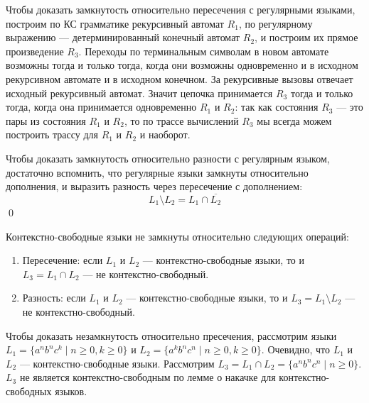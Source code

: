 Чтобы доказать замкнутость относительно пересечения с регулярными языками, построим по КС грамматике рекурсивный автомат $R_1$, по регулярному выражению --- детерминированный конечный автомат $R_2$, и построим их прямое произведение $R_3$.
Переходы по терминальным символам в новом автомате возможны тогда и только тогда, когда они возможны одновременно и в исходном рекурсивном автомате и в исходном конечном.
За рекурсивные вызовы отвечает исходный рекурсивный автомат.
Значит цепочка принимается $R_3$ тогда и только тогда, когда она принимается одновременно $R_1$ и $R_2$: так как состояния $R_3$ --- это пары из состояния $R_1$ и $R_2$, то по трассе вычислений $R_3$ мы всегда можем построить трассу для $R_1$ и $R_2$ и наоборот.

Чтобы доказать замкнутость относительно разности с регулярным языком, достаточно вспомнить, что регулярные языки замкнуты относительно дополнения, и выразить разность через пересечение с дополнением:
\[
  L_1 \setminus L_2 = L_1 \cap \overline{L_2}
\]
\qed

\begin{theorem}
Контекстно-свободные языки не замкнуты относительно следующих операций:
\begin{enumerate}
  \item Пересечение: если $L_1$ и $L_2$ --- контекстно-свободные языки, то и $L_3 = L_1 \cap L_2$ --- не контекстно-свободный.
  \item Разность: если $L_1$ и $L_2$ --- контекстно-свободные языки, то и $L_3 = L_1 \setminus L_2$ --- не контекстно-свободный.
\end{enumerate}
\end{theorem}

Чтобы доказать незамкнутость относительно пресечения, рассмотрим языки $L_1 = \{a^n b^n c^k \mid n \geq 0, k \geq 0\}$ и $L_2 = \{a^k b^n c^n \mid n \geq 0, k \geq 0\}$.
Очевидно, что $L_1$ и $L_2$ --- контекстно-свободные языки.
Рассмотрим $L_3 = L_1 \cap L_2 = \{a^n b^n c^n \mid n \geq 0\}$.
$L_3$ не является контекстно-свободным по лемме о накачке для контекстно-свободных языков.

